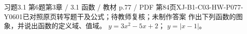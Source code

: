 \par\noindent\begin{minipage}{\linewidth}
\begin{bankitem}{习题3.1 第6题}{第3章 / 3.1 函数 / 教材 p.77 / PDF 第84页}{XJ-B1-C03-HW-P077-Y0601}{已对照原页转写题干及公式；待教师复核；未制作答案}
作出下列函数的图象，并说出函数的定义域、值域。
$y=3x^2-5x+2$；
$y=|x-1|$。
\end{bankitem}
\end{minipage}\par\medskip
